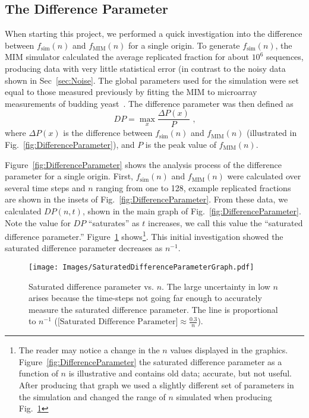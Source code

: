 	
		\subsection{The Difference Parameter}
		\label{subsec:earlywork}
		
		When starting this project, we performed a quick investigation into the difference between $f_\text{sim}(n)$ and $f_\text{MIM}(n)$ for a single origin.
		To generate $f_\text{sim}(n)$, the MIM simulator calculated the average replicated fraction for about $10^6$ sequences, producing data with very little statistical error (in contrast to the noisy data shown in Sec~\ref{sec:Noise}.
		The global parameters used for the simulation were set equal to those measured previously by fitting the MIM to microarray measurements of budding yeast~\cite{ScottsPaper}.
		The difference parameter was then defined as
		\begin{equation} \label{DifferenceParameter}
			DP = \max_{x} {\frac {\Delta P(x)} {P}} \text{ ,}
		\end{equation}
		where $\Delta P(x)$ is the difference between $f_\text{sim}(n)$ and $f_\text{MIM}(n)$ (illustrated in Fig.~\ref{fig:DifferenceParameter}), and $P$ is the peak value of $f_\text{MIM}(n)$.
		
		Figure~\ref{fig:DifferenceParameter} shows the analysis process of the difference parameter for a single origin.
		First, $f_\text{sim}(n)$ and $f_\text{MIM}(n)$ were calculated over several time steps and $n$ ranging from one to 128, example replicated fractions are shown in the insets of Fig.~\ref{fig:DifferenceParameter}.
		From these data, we calculated $DP(n,t)$, shown in the main graph of Fig.~\ref{fig:DifferenceParameter}.
		Note the value for $DP$ ``saturates'' as $t$ increases, we call this value the ``saturated difference parameter.''
		Figure~\ref{fig:SaturatedDifferenceParameter} shows\footnote{
		The reader may notice a change in the $n$ values displayed in the graphics. Figure~\ref{fig:DifferenceParameter} the saturated difference parameter as a function of $n$ is illustrative and contains old data; accurate, but not useful.
		After producing that graph we used a slightly different set of parameters in the simulation and changed the range of $n$ simulated when producing Fig.~\ref{fig:SaturatedDifferenceParameter}}.
		This initial investigation showed the saturated difference parameter decreases as $n^{-1}$.
		
		\begin{figure}[tbh]
			\begin{center}
				\texttt{[image: Images/SaturatedDifferenceParameterGraph.pdf]}
			\end{center}
				\caption[Saturated Difference Parameter vs. $n$]{\label{fig:SaturatedDifferenceParameter} Saturated difference parameter vs. $n$.
				The large uncertainty in low $n$ arises because the time-steps not going far enough to accurately measure the saturated difference parameter.
				The line is proportional to $n^{-1}$ ($\text{[Saturated Difference Parameter]} \approx \frac{0.3}{n}$).
				}
		\end{figure}
		
